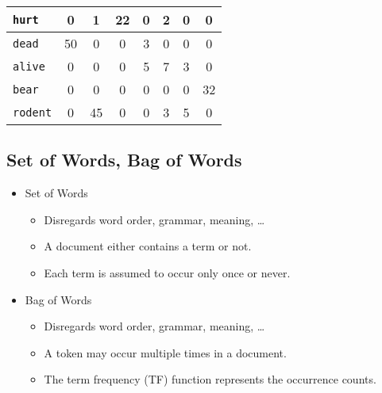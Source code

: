 \documentclass[a4paper, 11pt, accentcolor = tud3b]{tudreport}
\begin{document}
\begin{table}[H]
\begin{tabular}{|l|c|c|c|c|c|c|c|}
                            \texttt{hurt}   & \textcolor{irl}{0} &         1          &         22         & \textcolor{irl}{0} &         2          & \textcolor{irl}{0} & \textcolor{irl}{0} \\ \hline
                            \texttt{dead}   &         50         & \textcolor{irl}{0} & \textcolor{irl}{0} &         3          & \textcolor{irl}{0} & \textcolor{irl}{0} & \textcolor{irl}{0} \\ \hline
                            \texttt{alive}  & \textcolor{irl}{0} & \textcolor{irl}{0} & \textcolor{irl}{0} &         5          &         7          &         3          & \textcolor{irl}{0} \\ \hline
                            \texttt{bear}   & \textcolor{irl}{0} & \textcolor{irl}{0} & \textcolor{irl}{0} & \textcolor{irl}{0} & \textcolor{irl}{0} & \textcolor{irl}{0} &         32         \\ \hline
                            \texttt{rodent} & \textcolor{irl}{0} &         45         & \textcolor{irl}{0} & \textcolor{irl}{0} &         3          &         5          & \textcolor{irl}{0} \\ \hline
                        \end{tabular}
                    \end{table}

            \subsection{Set of Words, Bag of Words} %
                \begin{itemize}
                	\item Set of Words
                		\begin{itemize}
                			\item Disregards word order, grammar, meaning, \dots
                			\item A document either contains a term or not.
                			\item Each term is assumed to occur only once or never.
                		\end{itemize}
                	\item Bag of Words
                		\begin{itemize}
                			\item Disregards word order, grammar, meaning, \dots
                			\item A token may occur multiple times in a document.
                			\item The term frequency (TF) function represents the occurrence counts.
                		\end{itemize}
                \end{itemize}
\end{document}
